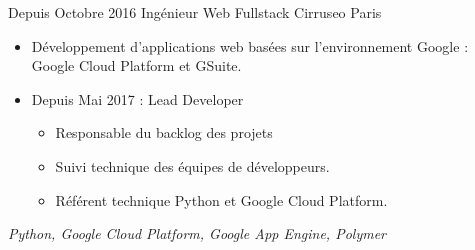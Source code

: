 \cventry
    {Depuis Octobre 2016}
    {Ingénieur Web Fullstack}
    {}
    {Cirruseo}
    {Paris}
    {
        \begin{itemize}
            \item Développement d'applications web basées sur l'environnement Google : Google Cloud Platform et GSuite.
            \item Depuis Mai 2017 : Lead Developer
            \begin{itemize}
                \item Responsable du backlog des projets
                \item Suivi technique des équipes de développeurs.
                \item Référent technique Python et Google Cloud Platform.
            \end{itemize}
        \end{itemize}
        \textit{Python, Google Cloud Platform, Google App Engine, Polymer}
    }
\vspace*{0.2cm}